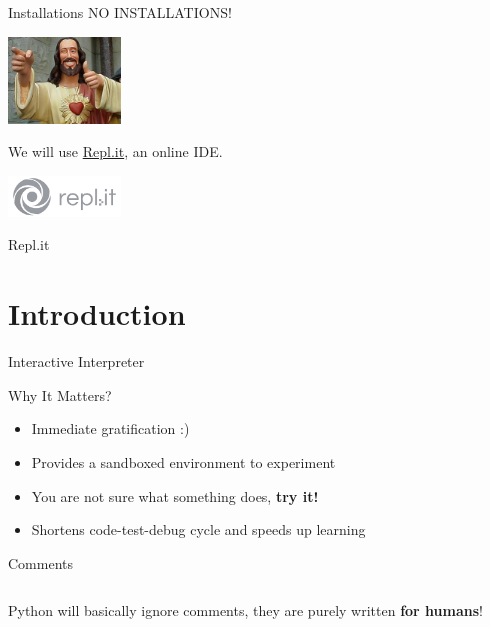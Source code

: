 	 	\begin{frame}{Installations}
			\LARGE
			\pause
			NO INSTALLATIONS!
			\pause
			\begin{center}
				\includegraphics[width=3.0cm]{images/gotcha_jesus.jpg}
			\end{center}
			\pause
			We will use \href{https://repl.it}{Repl.it}, an online IDE.
			\begin{center}
				\includegraphics[width=3.0cm]{images/replit_logo.png}
			\end{center}
		\end{frame}
		 
		\begin{frame}{Repl.it}
			
		
		\end{frame}

	\section{Introduction}
		\begin{frame}{Interactive Interpreter}
		
		\end{frame}

		\begin{frame}{Why It Matters?}
			\begin{itemize}
				\LARGE
				\pause
				\item Immediate gratification :)
				\pause
				\item Provides a sandboxed environment to experiment
				\pause
				\item You are not sure what something does, \textbf{try it!}
				\pause
				\item Shortens code-test-debug cycle and speeds up learning 
			\end{itemize}
		\end{frame}
		
		\begin{frame}{Comments}
			\LARGE
			\inputminted[frame=single,framesep=2pt]{python3}{code-examples/comments.py}
			Python will basically ignore comments, they are purely written \textbf{for humans}!
		\end{frame}

